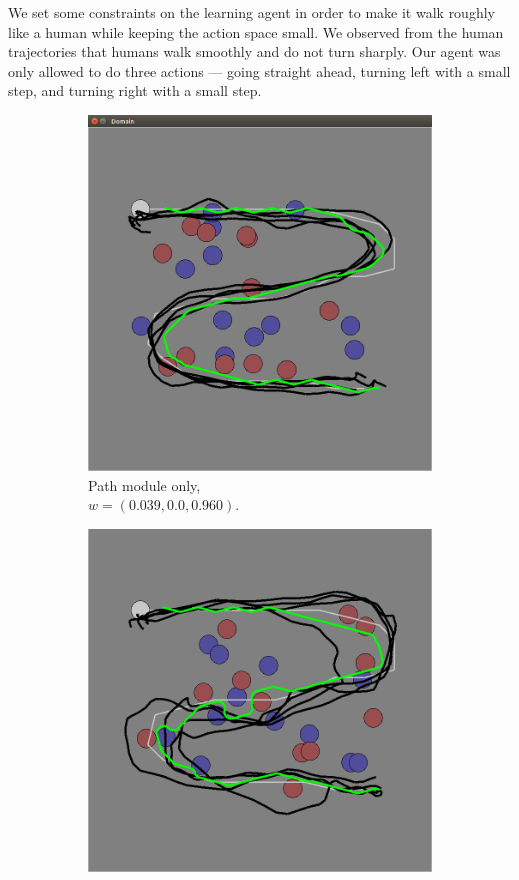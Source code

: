 \documentclass[11pt]{article} %
\begin{document}
We set some constraints on the learning agent in order to make it walk roughly
like a human while keeping the action space small.  We observed from the human
trajectories that humans walk smoothly and do not turn sharply.  Our agent was
only allowed to do three actions --- going straight ahead, turning left with a
small step, and turning right with a small step.

\begin{figure}[h]
\centering
\begin{subfigure}[b]{0.24\textwidth}
\includegraphics[width=\textwidth]{task_1.png}
\caption{Path module only,\\$w = (0.039, 0.0, 0.960)$. }
\end{subfigure}
\begin{subfigure}[b]{0.24\textwidth}
\includegraphics[width=\textwidth]{task_2.png}

\end{subfigure}
\end{figure}
\end{document}
